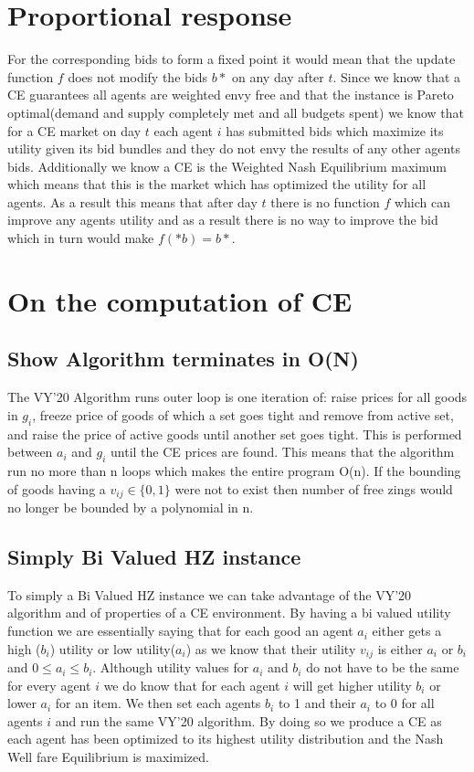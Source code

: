 \documentclass{article}
\begin{document}
\section{Proportional response}
For the corresponding bids to form a fixed point it would mean that the update function $f$ does not modify the bids $b*$ on any day after $t$. Since we know that a CE guarantees all agents are weighted envy free and that the instance is Pareto optimal(demand and supply completely met and all budgets spent) we know that for a CE market on day $t$ each agent $i$ has submitted bids which maximize its utility given its bid bundles and they do not envy the results of any other agents bids. Additionally we know a CE is the Weighted Nash Equilibrium maximum which means that this is the market which has optimized the utility for all agents. As a result this means that after day $t$ there is no function $f$ which can improve any agents utility and as a result there is no way to improve the bid which in turn would make $f(*b) = b*$. 
\section{On the computation of CE}
\subsection{Show Algorithm terminates in O(N)}
The VY'20 Algorithm runs outer loop is one iteration of: raise prices for all goods in $g_i$, freeze price of goods of which a set goes tight and remove from active set, and raise the price of active goods until another set goes tight. This is performed between $a_i$ and $g_i$ until the CE prices are found. This means that the algorithm run no more than n loops which makes the entire program O(n). If the bounding of goods having a $v_{ij} \in \{0,1\}$  were not to exist then number of free zings would no longer be bounded by a polynomial in n.
\subsection{Simply Bi Valued HZ instance}
To simply a Bi Valued HZ instance we can take advantage of the VY'20 algorithm and of properties of a CE environment. By having a bi valued utility function we are essentially saying that for each good  an agent $a_i$ either gets a high ($b_i$) utility or low utility($a_i$) as we know that their utility $v_{ij}$ is either $a_i$ or $b_i$ and $0 \le a_i \le b_i$. Although utility values for $a_i$ and $b_i$ do not have to be the same for every agent $i$ we do know that for each agent $i$ will get higher utility $b_i$ or lower $a_i$ for an item. We then set each agents $b_i$ to 1 and their $a_i$ to 0 for all agents $i$  and run the same VY'20 algorithm. By doing so we produce a CE as each agent has been optimized to its highest utility distribution and the Nash Well fare Equilibrium is maximized.
\end{document}
